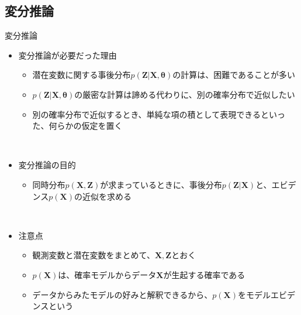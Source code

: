\documentclass[dvipdfmx,notheorems,t]{beamer}
\begin{document}
\subsection{変分推論}

\begin{frame}{変分推論}

\begin{itemize}
	\item 変分推論が必要だった理由
	\begin{itemize}
		\item 潜在変数に関する事後分布$p(\bm{Z} | \bm{X}, \bm{\theta})$の計算は、困難であることが多い
		\item $p(\bm{Z} | \bm{X}, \bm{\theta})$の厳密な計算は諦める代わりに、\alert{別の確率分布で近似}したい
		\newline
		\item 別の確率分布で近似するとき、単純な項の積として表現できるといった、\alert{何らかの仮定を置く}
	\end{itemize} \
	
	\item 変分推論の目的
	\begin{itemize}
		\item 同時分布$p(\bm{X}, \bm{Z})$が求まっているときに、\alert{事後分布}$p(\bm{Z} | \bm{X})$と、\alert{エビデンス}$p(\bm{X})$の近似を求める
	\end{itemize} \
	
	\item 注意点
	\begin{itemize}
		\item 観測変数と潜在変数をまとめて、$\bm{X}, \bm{Z}$とおく
		\item $p(\bm{X})$は、確率モデルからデータ$\bm{X}$が生起する確率である
		\item \alert{データからみたモデルの好み}と解釈できるから、$p(\bm{X})$を\alert{モデルエビデンス}という
	\end{itemize}
\end{itemize}

\end{frame}
\end{document}
